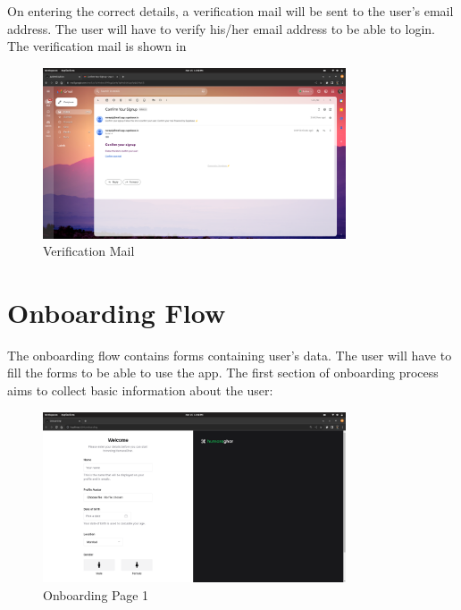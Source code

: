 On entering the correct details, a verification mail will be sent to the user’s email address. The user will have to
verify his/her email address to be able to login. The verification mail is shown in \par
\begin{figure}[h]
    \centering
    \includegraphics[width=0.8\textwidth]{Images/screenshots/mail.png}
    \caption{Verification Mail}
\end{figure}
\clearpage

\section{Onboarding Flow}
The onboarding flow contains forms containing user's data. The user will have to fill the forms to be able to use the
app. The first section of onboarding process aims to collect basic information about the user:

\begin{figure}[h]
    \centering
    \includegraphics[width=0.8\textwidth]{Images/screenshots/onboarding.png}
    \caption{Onboarding Page 1}
\end{figure}

